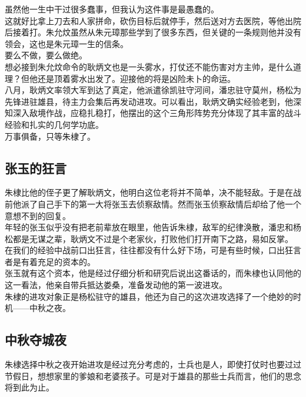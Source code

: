 \begin{multicols}{\theparacolNo}
虽然他一生中干过很多蠢事，但我认为这件事是最愚蠢的。\\

这就好比拿上刀去和人家拼命，砍伤目标后就停手，然后送对方去医院，等他出院后接着打。朱允炆虽然从朱元璋那些学到了很多东西，但关键的一条规则他并没有领会，这也是朱元璋一生的信条。\\

要么不做，要么做绝。\\

想必接到朱允炆命令的耿炳文也是一头雾水，打仗还不能伤害对方主帅，是什么道理？但他还是顶着雾水出发了。迎接他的将是凶险未卜的命运。\\

八月，耿炳文率领大军到达了真定，他派遣徐凯驻守河间，潘忠驻守莫州，杨松为先锋进驻雄县，待主力会集后再发动进攻。可以看出，耿炳文确实经验老到，他深知深入敌境作战，应稳扎稳打，他摆出的这个三角形阵势充分体现了其丰富的战斗经验和扎实的几何学功底。\\

万事俱备，只等朱棣了。\\

\subsection{张玉的狂言}
朱棣比他的侄子更了解耿炳文，他明白这位老将并不简单，决不能轻敌。于是在战前他派了自己手下的第一大将张玉去侦察敌情。然而张玉侦察敌情后却给了他一个意想不到的回复。\\

年轻的张玉似乎没有把老前辈放在眼里，他告诉朱棣，敌军的纪律涣散，潘忠和杨松都是无谋之辈，耿炳文不过是个老家伙，打败他们打开南下之路，易如反掌。\\

在我们的经验中战前口出狂言，往往都没有什么好下场，可是有些时候，口出狂言者是有着充足的资本的。\\

张玉就有这个资本，他是经过仔细分析和研究后说出这番话的，而朱棣也认同他的这一看法，他亲自带兵抵达娄桑，准备发动他的第一波进攻。\\

朱棣的进攻对象正是杨松驻守的雄县，他还为自己的这次进攻选择了一个绝妙的时机——中秋之夜。\\

\subsection{中秋夺城夜}
朱棣选择中秋之夜开始进攻是经过充分考虑的，士兵也是人，即使打仗时也要过过节假日，想想家里的爹娘和老婆孩子。可是对于雄县的那些士兵而言，他们的思念将到此为止。\\


\end{multicols}
